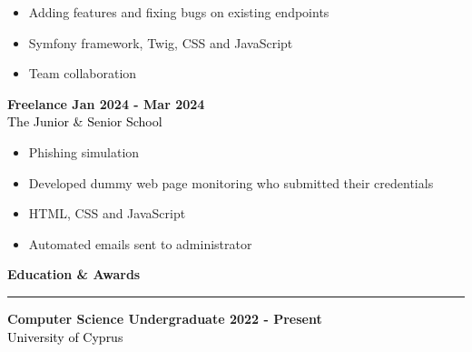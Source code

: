 \documentclass[12pt]{article}
\begin{document}
\begin{paracol}{2}
      {\renewcommand{\labelitemi}{\textcolor{bgcolor}{\normalsize$\bullet$}}%
      \begin{itemize}[leftmargin=33pt, itemsep=0pt, topsep=0pt]
         \item Adding features and fixing bugs on existing endpoints\\
            \item Symfony framework, Twig, CSS and JavaScript\\
            \item Team collaboration\\
         \end{itemize}
      }
      \vspace{0.5cm}
      \textbf{\textcolor{bgcolor}{Freelance \hfill Jan 2024 - Mar 2024}}\\[0.5em]
      \textcolor{black}{The Junior \& Senior School}\\[0.5em]
      {\renewcommand{\labelitemi}{\textcolor{bgcolor}{\normalsize$\bullet$}}%
      \begin{itemize}[leftmargin=33pt, itemsep=0pt, topsep=0pt]
            \item Phishing simulation\\
            \item Developed dummy web page monitoring who submitted their credentials\\
            \item HTML, CSS and JavaScript\\
            \item Automated emails sent to administrator\\
         \end{itemize}
      }
      \vspace{1cm}
      {\fontsize{14pt}{13pt}\selectfont
      \textbf{\textcolor{bgcolor}{Education \& Awards}}\\[0.3em]
      }
      \hrule
      \vspace{0.5cm}
      \textbf{\textcolor{bgcolor}{Computer Science Undergraduate \hfill 2022 - Present}}\\[0.5em]
      \textcolor{black}{University of Cyprus}\\[0.5em]
      {\renewcommand{\labelitemi}{\textcolor{bgcolor}{\normalsize$\bullet$}}%
      \begin{itemize}[leftmargin=33pt, itemsep=0pt, topsep=0pt]

\end{itemize}}
\end{paracol}
\end{document}
